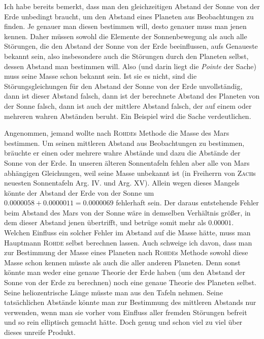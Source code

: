 Ich habe bereits bemerkt, dass man den gleichzeitigen Abstand der Sonne von der Erde unbedingt braucht, um den Abstand eines Planeten aus Beobachtungen zu finden. Je genauer man diesen bestimmen will, desto genauer muss man jenen kennen. Daher müssen sowohl die Elemente der Sonnenbewegung als auch alle Störungen, die den Abstand der Sonne von der Erde beeinflussen, aufs Genaueste bekannt sein, also insbesondere auch die Störungen durch den Planeten selbst, dessen Abstand man bestimmen will. Also (und darin liegt die \emph{Pointe} der Sache) muss seine Masse schon bekannt sein. Ist sie es nicht, sind die Störungsgleichungen für den Abstand der Sonne von der Erde unvollständig, dann ist dieser Abstand falsch, dann ist der berechnete Abstand des Planeten von der Sonne falsch, dann ist auch der mittlere Abstand falsch, der auf einem oder mehreren wahren Abständen beruht. Ein Beispiel wird die Sache verdeutlichen.

Angenommen, jemand wollte nach \textsc{Rohde}s Methode die Masse des Mars bestimmen. Um seinen mittleren Abstand aus Beobachtungen zu bestimmen, bräuchte er einen oder mehrere wahre Abstände und dazu die Abstände der Sonne von der Erde. In unseren älteren Sonnentafeln fehlen aber alle von Mars abhängigen Gleichungen, weil seine Masse unbekannt ist (in Freiherrn von \textsc{Zach}s neuesten Sonnentafeln Arg. IV. und Arg. XV). Allein wegen dieses Mangels könnte der Abstand der Erde von der Sonne um $0.0000058 + 0.0000011 = 0.0000069$ fehlerhaft sein. Der daraus entstehende Fehler beim Abstand des Mars von der Sonne wäre in demselben Verhältnis größer, in dem dieser Abstand jenen übertrifft, und betrüge somit mehr als $0.00001$. Welchen Einfluss ein solcher Fehler im Abstand auf die Masse hätte, muss man Hauptmann \textsc{Rohde} selbst berechnen lassen. Auch schweige ich davon, dass man zur Bestimmung der Masse eines Planeten nach \textsc{Rohde}s Methode sowohl diese Masse schon kennen müsste als auch die aller anderen Planeten. Denn sonst könnte man weder eine genaue Theorie der Erde haben (um den Abstand der Sonne von der Erde zu berechnen) noch eine genaue Theorie des Planeten selbst. Seine heliozentrische Länge müsste man aus den Tafeln nehmen. Seine tatsächlichen Abstände könnte man zur Bestimmung des mittleren Abstands nur verwenden, wenn man sie vorher vom Einfluss aller fremden Störungen befreit und so rein elliptisch gemacht hätte. Doch genug und schon viel zu viel über dieses unreife Produkt.
